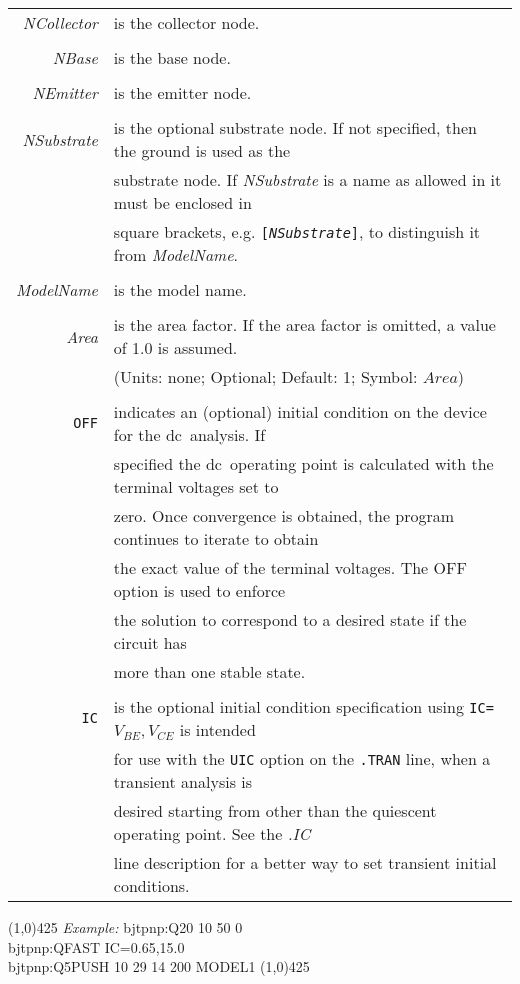\documentclass{article}
\begin{document}
\begin{tabular}{r l}
{\it NCollector} & is the collector node. \\
& \\
{\it NBase} & is the base node. \\
& \\
{\it NEmitter} & is the emitter node. \\
& \\
{\it NSubstrate} & is the optional substrate node. If not specified, then the ground is used as the \\
& substrate node. If {\it NSubstrate} is a name as allowed in it must be enclosed in \\
& square brackets, e.g. {\tt [{\it NSubstrate}]}, to distinguish it from {\it ModelName}. \\
& \\
{\it ModelName} & is  the  model  name. \\
& \\
{\it Area} & is  the  area  factor. If the area  factor  is  omitted,  a  value of 1.0 is assumed. \\
& (Units: none; Optional; Default: 1; Symbol: $Area$) \\
& \\
{\tt OFF} & indicates an (optional) initial condition on the device for the dc\ analysis. If \\
& specified the dc\ operating point is calculated with the terminal voltages set to \\
& zero. Once convergence is obtained, the program continues to iterate to obtain \\
& the exact value of the  terminal  voltages.  The OFF option is used to enforce \\
& the solution to  correspond to  a  desired state if the circuit has \\
& more than one stable state. \\
& \\
{\tt IC} & is the optional initial condition specification using  {\tt IC=}$V_{BE},V_{CE}$ is  intended \\
& for use with the {\tt UIC} option on the {\tt .TRAN} line, when a transient analysis is \\
& desired  starting  from  other than  the  quiescent  operating  point. See  the {\it .IC} \\
& line description for a better way to set transient initial conditions.
\end{tabular}
\newpage
\noindent\linethickness{0.5mm}\line(1,0){425}
\newline
\noindent\textit{Example:}
\newline
bjtpnp:Q20 10 50 0\\
bjtpnp:QFAST IC=0.65,15.0 \\
bjtpnp:Q5PUSH 10 29 14 200 MODEL1
\newline
\linethickness{0.5mm}\line(1,0){425}
\end{document}
